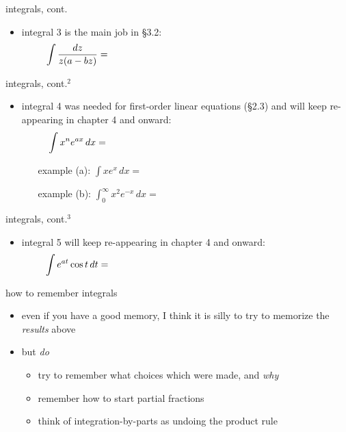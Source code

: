 \documentclass[colorlinks]{beamer}
\begin{document}
\begin{frame}{integrals, cont.}

\begin{itemize}
\item {\color{blue} integral 3} is the main job in \S3.2:
    $$\int \frac{dz}{z(a-bz)} = \hspace{80mm}$$

\vspace{50mm}
\end{itemize}
\end{frame}


\begin{frame}{integrals, cont.$^2$}

\begin{itemize}
\item {\color{blue} integral 4} was needed for first-order linear equations (\S2.3) and will keep re-appearing in chapter 4 and onward:
    $$\int x^n e^{ax}\,dx = \hspace{80mm}$$

\vspace{35mm}

    \begin{itemize}
    \item[example (a):] $\int x e^x\,dx = $
    
    \bigskip\bigskip
    \item[example (b):] $\int_0^\infty x^2 e^{-x}\,dx = $
    
    \bigskip\bigskip
    \end{itemize}
\end{itemize}
\end{frame}


\begin{frame}{integrals, cont.$^3$}

\begin{itemize}
\item {\color{blue} integral 5} will keep re-appearing in chapter 4 and onward:
    $$\int e^{at} \cos t\,dt = \hspace{80mm}$$

\vspace{60mm}
\end{itemize}
\end{frame}


\begin{frame}{how to remember integrals}

\begin{itemize}
\item even if you have a good memory, I think it is silly to try to memorize the \emph{results} above
\item but \emph{do}
    \begin{itemize}
    \item try to remember what choices which were made, and \emph{why}
    \item remember how to start partial fractions
    \item think of integration-by-parts as undoing the product rule
    \end{itemize}
\end{itemize}
\end{frame}
\end{document}
